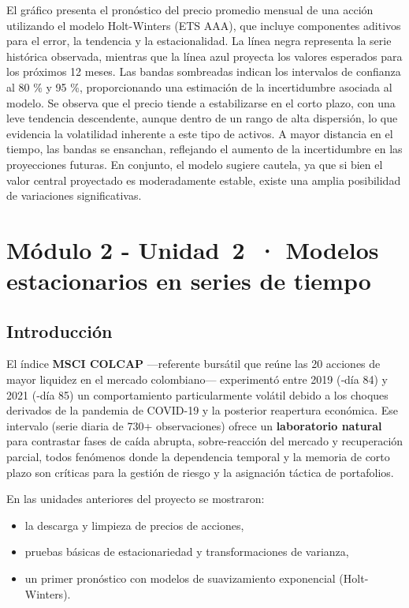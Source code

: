 \documentclass[
  11pt,
]{book}
\providecommand{\tightlist}{%
  \setlength{\itemsep}{0pt}\setlength{\parskip}{0pt}}
\begin{document}
El gráfico presenta el pronóstico del precio promedio mensual de una acción utilizando el modelo Holt-Winters (ETS AAA), que incluye componentes aditivos para el error, la tendencia y la estacionalidad. La línea negra representa la serie histórica observada, mientras que la línea azul proyecta los valores esperados para los próximos 12 meses. Las bandas sombreadas indican los intervalos de confianza al 80 \% y 95 \%, proporcionando una estimación de la incertidumbre asociada al modelo. Se observa que el precio tiende a estabilizarse en el corto plazo, con una leve tendencia descendente, aunque dentro de un rango de alta dispersión, lo que evidencia la volatilidad inherente a este tipo de activos. A mayor distancia en el tiempo, las bandas se ensanchan, reflejando el aumento de la incertidumbre en las proyecciones futuras. En conjunto, el modelo sugiere cautela, ya que si bien el valor central proyectado es moderadamente estable, existe una amplia posibilidad de variaciones significativas.

\chapter{Módulo 2 - Unidad~2~· Modelos estacionarios en series de tiempo}\label{unidad5}

\section{Introducción}\label{introducciuxf3n-1}

El índice \textbf{MSCI COLCAP} ---referente bursátil que reúne las 20 acciones de
mayor liquidez en el mercado colombiano--- experimentó entre 2019 (‐día 84)
y 2021 (‐día 85) un comportamiento particularmente volátil debido a los
choques derivados de la pandemia de COVID-19 y la posterior
reapertura económica.
Ese intervalo (serie diaria de 730+ observaciones) ofrece un \textbf{laboratorio
natural} para contrastar fases de caída abrupta, sobre-reacción del
mercado y recuperación parcial, todos fenómenos donde la dependencia
temporal y la memoria de corto plazo son críticas para la gestión de
riesgo y la asignación táctica de portafolios.

En las unidades anteriores del proyecto se mostraron:

\begin{itemize}
\tightlist
\item
  la descarga y limpieza de precios de acciones,
\item
  pruebas básicas de estacionariedad y transformaciones de varianza,
\item
  un primer pronóstico con modelos de suavizamiento exponencial
  (Holt-Winters).
\end{itemize}
\end{document}

